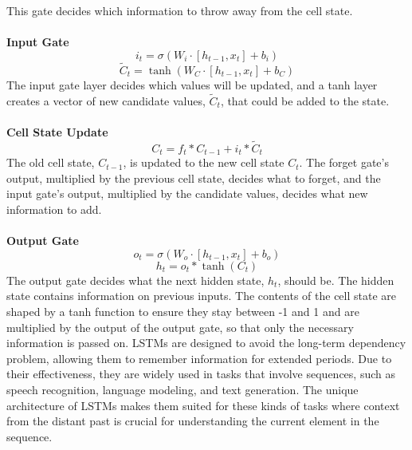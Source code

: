 \documentclass[12pt]{article}
\begin{document}
    \noindent This gate decides which information to throw away from the cell state.\\
    \\
    \textbf{Input Gate}
    \begin{equation}
        i_t = \sigma(W_i \cdot [h_{t-1}, x_t] + b_i)
    \end{equation}
    \begin{equation}
        \tilde{C}_t = \tanh(W_C \cdot [h_{t-1}, x_t] + b_C)
    \end{equation}
    The input gate layer decides which values will be updated, and a tanh layer creates a vector of new candidate values, \( \tilde{C}_t \), that could be added to the state.\\
    \\
    \textbf{Cell State Update}
    \begin{equation}
        C_t = f_t \ast C_{t-1} + i_t \ast \tilde{C}_t
    \end{equation}
    The old cell state, \( C_{t-1} \), is updated to the new cell state \( C_t \). The forget gate’s output, multiplied by the previous cell state, decides what to forget, and the input gate’s output, multiplied by the candidate values, decides what new information to add.\\
    \\
    \textbf{Output Gate}
    \begin{equation}
        o_t = \sigma(W_o \cdot [h_{t-1}, x_t] + b_o)
    \end{equation}
    \begin{equation}
        h_t = o_t \ast \tanh(C_t)
    \end{equation}
    The output gate decides what the next hidden state, \( h_t \), should be. The hidden state contains information on previous inputs. The contents of the cell state are shaped by a tanh function to ensure they stay between -1 and 1 and are multiplied by the output of the output gate, so that only the necessary information is passed on.
    LSTMs are designed to avoid the long-term dependency problem, allowing them to remember information for extended periods. Due to their effectiveness, they are widely used in tasks that involve sequences, such as speech recognition, language modeling, and text generation. The unique architecture of LSTMs makes them suited for these kinds of tasks where context from the distant past is crucial for understanding the current element in the sequence.

\newpage

\printbibliography
\end{document}
